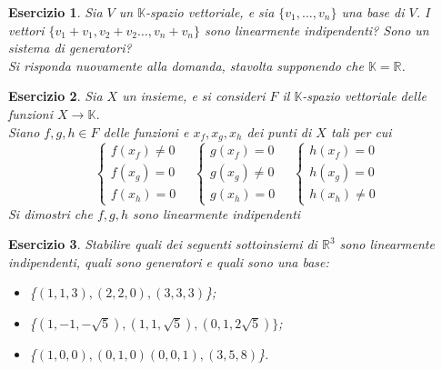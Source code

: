 \documentclass{article}
\newtheorem{es}{Esercizio}
\begin{document}
{\begin{es}
    Sia $V$ un $\mathbb{K}$-spazio vettoriale, e sia $\{v_1,\dots, v_n\}$ una base di $V$. I vettori $\{v_1+v_1,v_2+v_2\dots, v_n+v_n\}$ sono linearmente indipendenti? Sono un sistema di generatori?\\
    Si risponda nuovamente alla domanda, stavolta supponendo che $\mathbb{K}=\mathbb{R}$.
\end{es}


\begin{es}
    Sia $X$ un insieme, e si consideri $F$ il $\mathbb{K}$-spazio vettoriale delle funzioni $X\to \mathbb{K}$.\\
    Siano $f,g,h\in F$ delle funzioni e $x_f,x_g,x_h$ dei punti di $X$ tali per cui $$\begin{cases}
        f(x_f)\neq 0\\
        f(x_g)=0\\
        f(x_h)=0
    \end{cases}\quad \begin{cases}
        g(x_f)= 0\\
        g(x_g)\neq 0\\
        g(x_h)=0
    \end{cases}\quad \begin{cases}
        h(x_f)= 0\\
        h(x_g)= 0\\
        h(x_h)\neq 0
    \end{cases}$$
    Si dimostri che $f,g,h$ sono linearmente indipendenti
\end{es}

\begin{es}
    Stabilire quali dei seguenti sottoinsiemi di $\mathbb{R}^3$ sono linearmente indipendenti, quali sono generatori e quali sono una base:
    \begin{itemize}
        \item \{$(1,1,3),(2,2,0),(3,3,3)$\};
       \item \{$(1,-1,-\sqrt{5}),(1,1,\sqrt{5}),(0,1,2\sqrt{5})\}$;
       \item \{$(1,0,0),(0,1,0)(0,0,1),(3,5,8)$\}.
    \end{itemize}
\end{es}

}
\end{document}
